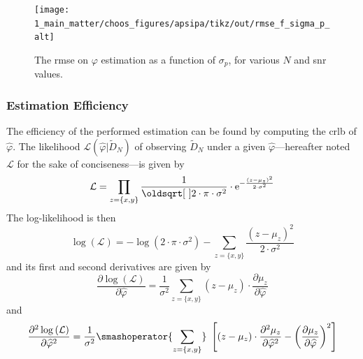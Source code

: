 \begin{figure}
	\centering
	\texttt{[image: 1\_main\_matter/choos\_figures/apsipa/tikz/out/rmse\_f\_sigma\_p\_alt]}
	\caption{The \gls{rmse} on $\varphi$ estimation as a function of $\sigma_p$, for various $N$ and \gls{snr} values.}
	\label{fig:choos:apsipa:rmse_f_sigma_p}
\end{figure}

\subsubsection{Estimation Efficiency}


The efficiency of the performed estimation can be found by computing the \gls{crlb} of $\widehat{\varphi}$. The likelihood $\mathcal{L}\left(\widehat{\varphi}|\widetilde{D}_N\right)$ of observing $\widetilde{D}_N$ under a given $\widehat{\varphi}$---hereafter noted $\mathcal{L}$ for the sake of conciseness---is given by
\begin{equation}
	\mathcal{L} = \prod_{z=\{x, y\}} \frac{1}{\sqrt{2\cdot \pi \cdot \sigma^2}} \cdot \e^{- \frac{\left(z - \mu_z\right)^2}{2\cdot \sigma^2}}
\end{equation}
The log-likelihood is then
\begin{equation}
	\log \left(\mathcal{L}\right) = -\log \left(2\cdot \pi \cdot \sigma^2\right) - \sum_{z=\{x, y\}} \frac{\left(z - \mu_z\right)^2}{2\cdot \sigma^2}
\end{equation}
and its first and second derivatives are given by
\begin{equation}
	\frac{\partial \log \left(\mathcal{L}\right)}{\partial \widehat{\varphi}} = \frac{1}{\sigma^2} \sum_{z=\{x, y\}} \left(z - \mu_z\right) \cdot \frac{\partial \mu_z}{\partial \widehat{\varphi}}
\end{equation}
and
\begin{equation}
	\frac{\partial^2 \log \left(\mathcal{L}\right)}{\partial \widehat{\varphi}^2} = \frac{1}{\sigma^2} \smashoperator{\sum_{z=\{x, y\}}}\ \left[ \left(z - \mu_z\right) \cdot \frac{\partial^2 \mu_z}{\partial \widehat{\varphi}^2} - \left(\frac{\partial \mu_z}{\partial \widehat{\varphi}}\right)^2 \right]
\end{equation}

